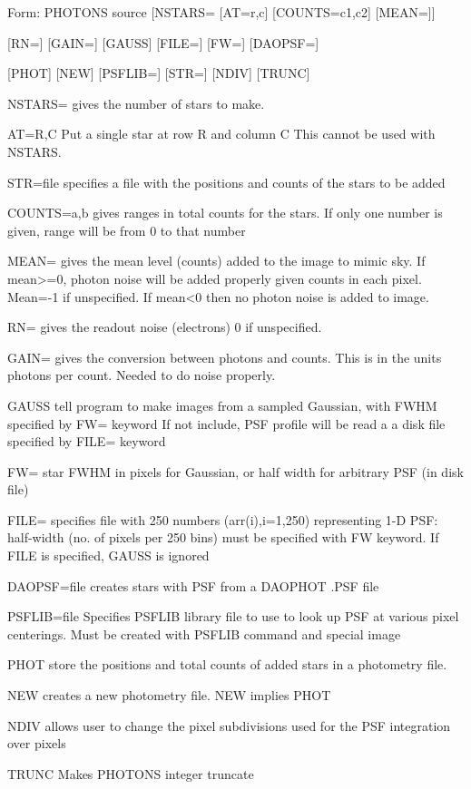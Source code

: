 {\newpage\clearpage
{}%
\begin{command}
  \item[Form: PHOTONS source [NSTARS=] [AT=r,c] [COUNTS=c1,c2] [MEAN=]\hfill]{}
  \item{[RN=] [GAIN=] [GAUSS] [FILE=] [FW=] [DAOPSF=]}
  \item{[PHOT] [NEW] [PSFLIB=] [STR=] [NDIV] [TRUNC]}
  \item[NSTARS=]{gives the number of stars to make.}
  \item[AT=R,C]{Put a single star at row R and column C
       This cannot be used with NSTARS.}
  \item[STR=file]{specifies a file with the positions and
       counts of the stars to be added}
  \item[COUNTS=a,b]{gives ranges in total counts for the
       stars. If only one number is given, range will be from 0 to that number}
  \item[MEAN=]{gives the mean level (counts) added to the image to mimic
       sky. If mean>=0, photon noise will be added properly given counts in
       each pixel.  Mean=-1 if unspecified. If mean<0 then no photon noise
       is added to image. }
  \item[RN=]{ gives the readout noise (electrons) 0 if unspecified. }
  \item[GAIN=]{gives the conversion between photons and counts.  This is in
       the units photons per count. Needed to do noise properly.}
  \item[GAUSS ]{tell program to make images from a sampled Gaussian, with
       FWHM specified by FW= keyword If not include, PSF profile will be
       read a a disk file specified by FILE= keyword}
  \item[FW=]{star FWHM in pixels for Gaussian, or half width for arbitrary
       PSF (in disk file)}
  \item[FILE=]{ specifies file with 250 numbers (arr(i),i=1,250)
       representing 1-D PSF: half-width (no. of pixels per 250 bins) must
       be specified with FW keyword.  If FILE is specified, GAUSS is
       ignored}
  \item[DAOPSF=file]{creates stars with PSF from a DAOPHOT .PSF file}
  \item[PSFLIB=file]{Specifies PSFLIB library file to use to look up PSF at
       various pixel centerings. Must be created with PSFLIB command and
       special image}
  \item[PHOT]{store the positions and total counts of added
       stars in a photometry file. }
  \item[NEW]{creates a new photometry file.  NEW implies PHOT}
  \item[NDIV]{allows user to change the pixel subdivisions
       used for the PSF integration over pixels}
  \item[TRUNC]{Makes PHOTONS integer truncate}
\end{command}%
\lthtmlfigureZ
\lthtmlcheckvsize\clearpage}


